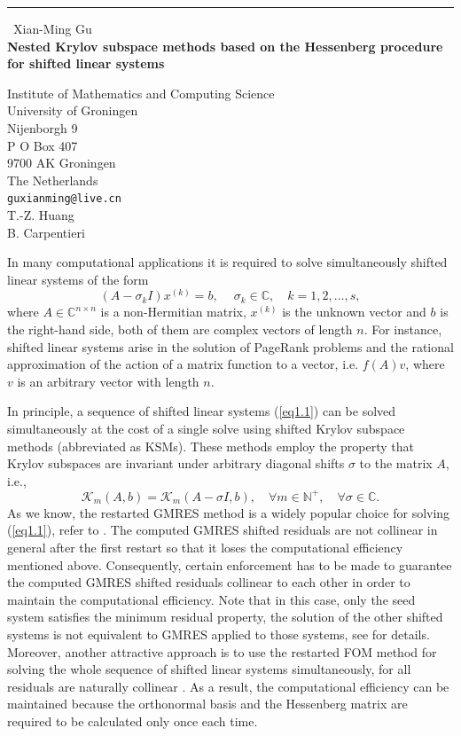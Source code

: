 \documentclass{report}
\begin{document}
\begin{center}
\rule{6in}{1pt} \
{\large Xian-Ming Gu \\
{\bf Nested Krylov subspace methods based on the Hessenberg procedure for shifted linear systems}}

Institute of Mathematics and Computing Science \\ University of Groningen \\ Nijenborgh 9 \\ P O Box 407 \\ 9700 AK Groningen \\ The Netherlands
\\
{\tt guxianming@live.cn}\\
T.-Z.  Huang\\
B. Carpentieri\end{center}

In many computational applications it is required to solve simultaneously
shifted linear systems of the form
\begin{equation}
(A - \sigma_k I)x^{(k)} = b,\quad\ \sigma_k \in \mathbb{C},\quad k = 1,2,\ldots,s,
\label{eq1.1}
\end{equation}
where $A\in \mathbb{C}^{n\times n}$ is a non-Hermitian matrix, $x^{(k)}$
is the unknown vector and $b$ is the right-hand side, both of them are
complex vectors of length $n$. For instance, shifted linear systems arise
in the solution of PageRank problems and the rational approximation of
the action of a matrix function to a vector, i.e. $f(A)v$, where $v$ is
an arbitrary vector with length $n$.

In principle, a sequence of shifted linear systems (\ref{eq1.1}) can be
solved simultaneously at the cost of a single solve using shifted Krylov
subspace methods (abbreviated as KSMs). These methods employ the property
that Krylov subspaces are invariant under arbitrary diagonal shifts
$\sigma$ to the matrix $A$, i.e.,
\begin{equation}
\mathcal{K}_m(A, b) = \mathcal{K}_m(A - \sigma I, b),\quad \forall m \in
\mathbb{N}^+,\quad
\forall \sigma \in \mathbb{C}.
\label{eq1.2}
\end{equation}
As we know, the restarted GMRES method is a widely popular choice for
solving (\ref{eq1.1}), refer to \cite{AFUGR}. The computed GMRES shifted
residuals are not collinear in
general after the first restart so that it loses the computational
efficiency mentioned above. Consequently,
certain enforcement has to be made to guarantee the computed GMRES
shifted residuals collinear to each other in order to maintain the
computational efficiency. Note that in this case,
only the seed system satisfies the minimum residual property, the
solution of the other shifted systems is not equivalent to GMRES applied
to those systems, see \cite{AFUGR} for details. Moreover, another
attractive approach is to use the restarted FOM method for solving the
whole sequence
of shifted linear systems simultaneously, for all residuals are naturally
collinear \cite{AFUGR,VSRF}. As a result, the computational efficiency
can be maintained because the orthonormal basis and the Hessenberg matrix
are required to be calculated only once each time.
\end{document}

